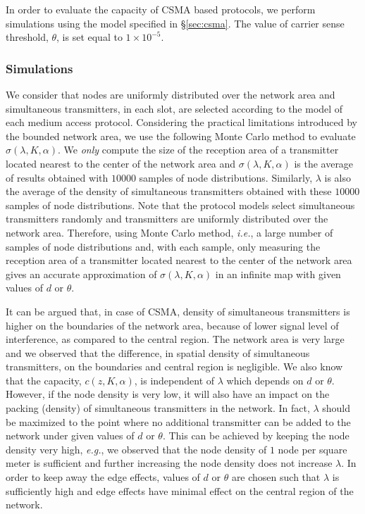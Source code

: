 \documentclass[12pt,english]{article}
\begin{document}
In order to evaluate the capacity of CSMA based protocols, we perform simulations using the model specified in \S \ref{sec:csma}. The value of carrier sense threshold, $\theta$, is set equal to $1\times 10^{-5}$.

\subsubsection{Simulations}

We consider that nodes are uniformly distributed over the network area and simultaneous transmitters, in each slot, are selected according to the model of each medium access protocol. Considering the practical limitations introduced by the bounded network area, we use the following Monte Carlo method to evaluate $\sigma(\lambda,K,\alpha)$. We {\em only} compute the size of the reception area of a transmitter located nearest to the center of the network area and $\sigma(\lambda,K,\alpha)$ is the average of results obtained with $10000$ samples of node distributions. Similarly, $\lambda$ is also the average of the density of simultaneous transmitters obtained with these $10000$ samples of node distributions. Note that the protocol models select simultaneous transmitters randomly and transmitters are uniformly distributed over the network area. Therefore, using Monte Carlo method, {\it i.e.}, a large number of samples of node distributions and, with each sample, only measuring the reception area of a transmitter located nearest to the center of the network area gives an accurate approximation of $\sigma(\lambda,K,\alpha)$ in an infinite map with given values of $d$ or $\theta$. 

It can be argued that, in case of CSMA, density of simultaneous transmitters is higher on the boundaries of the network area, because of lower signal level of interference, as compared to the central region. The network area is very large and we observed that the difference, in spatial density of simultaneous transmitters, on the boundaries and central region is negligible. We also know that the capacity, $c(z,K,\alpha)$, is independent of $\lambda$ which depends on $d$ or $\theta$. However, if the node density is very low, it will also have an impact on the packing (density) of simultaneous transmitters in the network. In fact, $\lambda$ should be maximized to the point where no additional transmitter can be added to the network under given values of $d$ or $\theta$. This can be achieved by keeping the node density very high, {\it e.g.}, we observed that the node density of $1$ node per square meter is sufficient and further increasing the node density does not increase $\lambda$. In order to keep away the edge effects, values of $d$ or $\theta$ are chosen such that $\lambda$ is sufficiently high and edge effects have minimal effect on the central region of the network.
\end{document}
